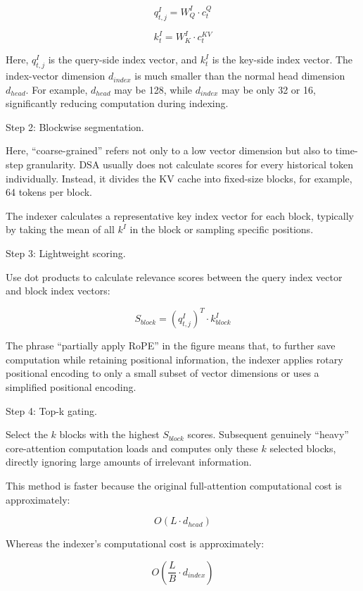 \[
q^I_{t,j} = W^I_Q \cdot c^Q_t
\]

\[
k^I_t = W^I_K \cdot c^{KV}_t
\]

Here, \(q^I_{t,j}\) is the query-side index vector, and \(k^I_t\) is the key-side index vector. The index-vector dimension \(d_{index}\) is much smaller than the normal head dimension \(d_{head}\). For example, \(d_{head}\) may be 128, while \(d_{index}\) may be only 32 or 16, significantly reducing computation during indexing.

Step 2: Blockwise segmentation.

Here, ``coarse-grained'' refers not only to a low vector dimension but also to time-step granularity. DSA usually does not calculate scores for every historical token individually. Instead, it divides the KV cache into fixed-size blocks, for example, 64 tokens per block.

The indexer calculates a representative key index vector for each block, typically by taking the mean of all \(k^I\) in the block or sampling specific positions.

Step 3: Lightweight scoring.

Use dot products to calculate relevance scores between the query index vector and block index vectors:

\[
S_{block} = (q^I_{t,j})^T \cdot k^I_{block}
\]

The phrase ``partially apply RoPE'' in the figure means that, to further save computation while retaining positional information, the indexer applies rotary positional encoding to only a small subset of vector dimensions or uses a simplified positional encoding.

Step 4: Top-k gating.

Select the \(k\) blocks with the highest \(S_{block}\) scores. Subsequent genuinely ``heavy'' core-attention computation loads and computes only these \(k\) selected blocks, directly ignoring large amounts of irrelevant information.

This method is faster because the original full-attention computational cost is approximately:

\[
O(L \cdot d_{head})
\]

Whereas the indexer's computational cost is approximately:

\[
O\left(\frac{L}{B} \cdot d_{index}\right)
\]

